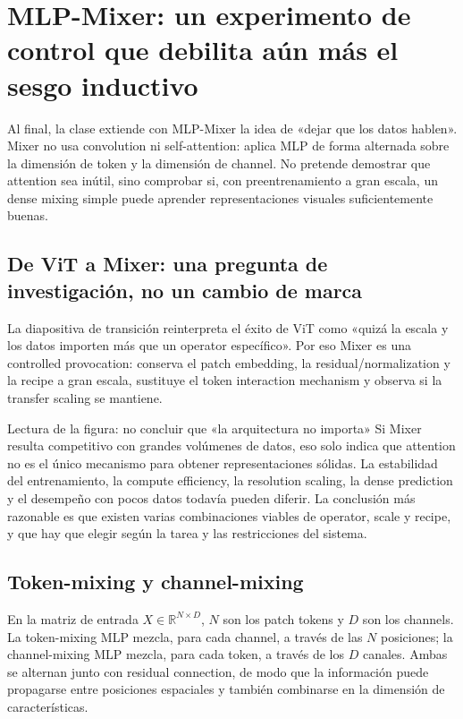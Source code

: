 \section{MLP-Mixer: un experimento de control que debilita aún más el sesgo inductivo}

Al final, la clase extiende con MLP-Mixer la idea de «dejar que los datos hablen». Mixer no usa convolution ni self-attention: aplica MLP de forma alternada sobre la dimensión de token y la dimensión de channel. No pretende demostrar que attention sea inútil, sino comprobar si, con preentrenamiento a gran escala, un dense mixing simple puede aprender representaciones visuales suficientemente buenas.

\subsection{De ViT a Mixer: una pregunta de investigación, no un cambio de marca}

La diapositiva de transición reinterpreta el éxito de ViT como «quizá la escala y los datos importen más que un operator específico». Por eso Mixer es una controlled provocation: conserva el patch embedding, la residual/normalization y la recipe a gran escala, sustituye el token interaction mechanism y observa si la transfer scaling se mantiene.


\begin{knowledgebox}{Lectura de la figura: no concluir que «la arquitectura no importa»}
Si Mixer resulta competitivo con grandes volúmenes de datos, eso solo indica que attention no es el único mecanismo para obtener representaciones sólidas. La estabilidad del entrenamiento, la compute efficiency, la resolution scaling, la dense prediction y el desempeño con pocos datos todavía pueden diferir. La conclusión más razonable es que existen varias combinaciones viables de operator, scale y recipe, y que hay que elegir según la tarea y las restricciones del sistema.
\end{knowledgebox}

\subsection{Token-mixing y channel-mixing}

En la matriz de entrada $X\in\mathbb{R}^{N\times D}$, $N$ son los patch tokens y $D$ son los channels. La token-mixing MLP mezcla, para cada channel, a través de las $N$ posiciones; la channel-mixing MLP mezcla, para cada token, a través de los $D$ canales. Ambas se alternan junto con residual connection, de modo que la información puede propagarse entre posiciones espaciales y también combinarse en la dimensión de características.


